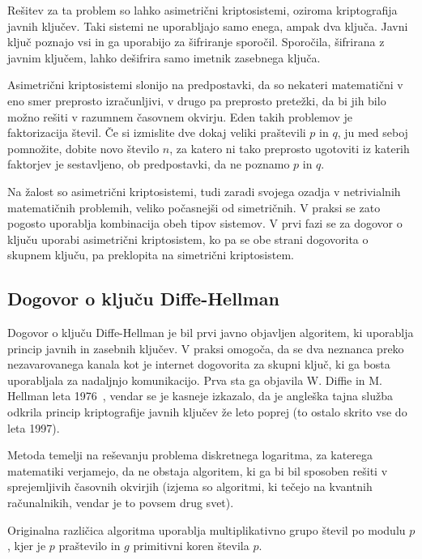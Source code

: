 \documentclass[12pt,a4paper,openany,tikz]{book}
\theoremstyle{plain}
\theoremstyle{definition}
\begin{document}
Rešitev za ta problem so lahko asimetrični kriptosistemi, oziroma kriptografija javnih ključev. Taki sistemi ne uporabljajo samo enega, ampak dva ključa. Javni ključ poznajo vsi in ga uporabijo za šifriranje sporočil. Sporočila, šifrirana z javnim ključem, lahko dešifrira samo imetnik zasebnega ključa.

Asimetrični kriptosistemi slonijo na predpostavki, da so nekateri matematični v eno smer preprosto izračunljivi, v drugo pa preprosto pretežki, da bi jih bilo možno rešiti v razumnem časovnem okvirju. Eden takih problemov je faktorizacija števil. Če si izmislite dve dokaj veliki praštevili $p$ in $q$, ju med seboj pomnožite, dobite novo število $n$, za katero ni tako preprosto ugotoviti iz katerih faktorjev je sestavljeno, ob predpostavki, da ne poznamo $p$ in $q$.

Na žalost so asimetrični kriptosistemi, tudi zaradi svojega ozadja v netrivialnih matematičnih problemih, veliko počasnejši od simetričnih. V praksi se zato pogosto uporablja kombinacija obeh tipov sistemov. V prvi fazi se za dogovor o ključu uporabi asimetrični kriptosistem, ko pa se obe strani dogovorita o skupnem ključu, pa preklopita na simetrični kriptosistem.

\subsection*{Dogovor o ključu Diffe-Hellman}
\label{sub:Dogovor o kljucu Diffe-Hellman}

Dogovor o ključu Diffe-Hellman je bil prvi javno objavljen algoritem, ki uporablja princip javnih in zasebnih ključev. V praksi omogoča, da se dva neznanca preko nezavarovanega kanala kot je internet dogovorita za skupni ključ, ki ga bosta uporabljala za nadaljnjo komunikacijo. Prva sta ga objavila W. Diffie in M. Hellman leta 1976~\cite{diffie1976new}, vendar se je kasneje izkazalo, da je angleška tajna služba odkrila princip kriptografije javnih ključev že leto poprej (to ostalo skrito vse do leta 1997).

Metoda temelji na reševanju problema diskretnega logaritma, za katerega matematiki verjamejo, da ne obstaja algoritem, ki ga bi bil sposoben rešiti v sprejemljivih časovnih okvirjih (izjema so algoritmi, ki tečejo na kvantnih računalnikih, vendar je to povsem drug svet).

Originalna različica algoritma uporablja multiplikativno grupo števil po modulu $p$, kjer je $p$ praštevilo in $g$ primitivni koren števila $p$.
\end{document}

